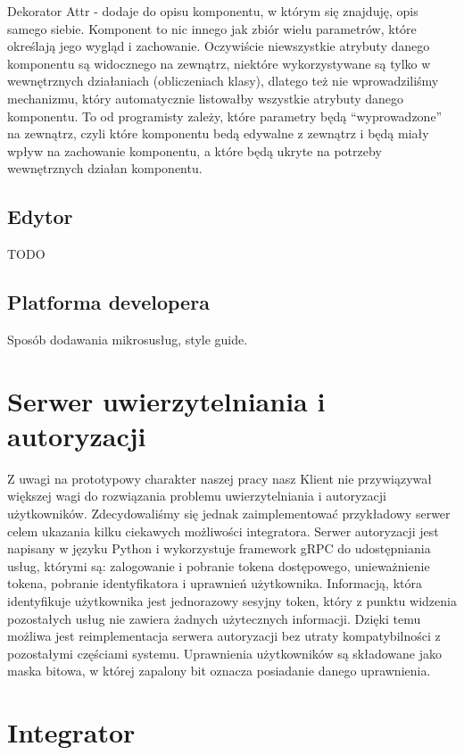 \documentclass[licencjacka]{pracamgr}
\begin{document}
Dekorator Attr - dodaje do opisu komponentu, w którym się znajduję, opis samego siebie.
Komponent to nic innego jak zbiór wielu parametrów, które określają jego wygląd i zachowanie.
Oczywiście niewszystkie atrybuty danego komponentu są widocznego na zewnątrz, niektóre wykorzystywane
są tylko w wewnętrznych działaniach (obliczeniach klasy), dlatego też nie wprowadziliśmy mechanizmu, który
automatycznie listowałby wszystkie atrybuty danego komponentu. To od programisty
zależy, które parametry będą ``wyprowadzone'' na zewnątrz, czyli które komponentu bedą edywalne z zewnątrz
i będą miały wpływ na zachowanie komponentu, a które będą ukryte na potrzeby wewnętrznych działan komponentu.


\subsection{Edytor}
TODO
\subsection{Platforma developera}
Sposób dodawania mikrosusług, style guide.

\section{Serwer uwierzytelniania i autoryzacji}

Z uwagi na prototypowy charakter naszej pracy nasz Klient nie przywiązywał większej
wagi do rozwiązania problemu uwierzytelniania i autoryzacji użytkowników. Zdecydowaliśmy
się jednak zaimplementować przykładowy serwer celem ukazania kilku ciekawych
możliwości integratora. Serwer autoryzacji jest napisany w języku Python i wykorzystuje
framework gRPC do udostępniania usług, którymi są: zalogowanie i pobranie tokena
dostępowego, unieważnienie tokena, pobranie identyfikatora i uprawnień użytkownika.
Informacją, która identyfikuje użytkownika jest jednorazowy sesyjny token, który
z punktu widzenia pozostałych usług nie zawiera żadnych użytecznych informacji.
Dzięki temu możliwa jest reimplementacja serwera autoryzacji bez utraty kompatybilności
z pozostałymi częściami systemu. Uprawnienia użytkowników są składowane jako maska
bitowa, w której zapalony bit oznacza posiadanie danego uprawnienia.

\section{Integrator}
\end{document}
